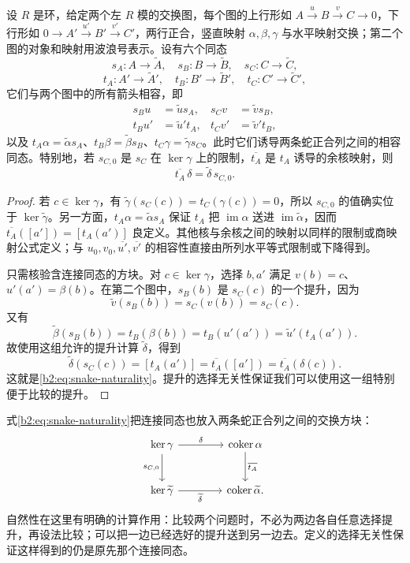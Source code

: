\begin{proposition}[蛇引理的自然性]\label{b2:prop:snake-naturality}
	设 \(R\) 是环，给定两个左 \(R\) 模的交换图，每个图的上行形如 \(A\xrightarrow{u}B\xrightarrow{v}C\to0\)，下行形如 \(0\to A'\xrightarrow{u'}B'\xrightarrow{v'}C'\)，两行正合，竖直映射 \(\alpha,\beta,\gamma\) 与水平映射交换；第二个图的对象和映射用波浪号表示。设有六个同态
	\[
		s_A:A\to\widetilde A,\quad s_B:B\to\widetilde B,\quad s_C:C\to\widetilde C,
	\]
	\[
		t_A:A'\to\widetilde A',\quad t_B:B'\to\widetilde B',\quad t_C:C'\to\widetilde C',
	\]
	它们与两个图中的所有箭头相容，即
	\[
		\begin{aligned}
			s_Bu&=\widetilde u s_A,&s_Cv&=\widetilde v s_B,\\
			t_Bu'&=\widetilde u' t_A,&t_Cv'&=\widetilde v' t_B,
		\end{aligned}
	\]
	以及 \(t_A\alpha=\widetilde\alpha s_A\)、\(t_B\beta=\widetilde\beta s_B\)、\(t_C\gamma=\widetilde\gamma s_C\)。此时它们诱导两条蛇正合列之间的相容同态。特别地，若 \(s_{C,0}\) 是 \(s_C\) 在 \(\ker\gamma\) 上的限制，\(\overline{t_A}\) 是 \(t_A\) 诱导的余核映射，则
	\begin{equation}\label{b2:eq:snake-naturality}
		\overline{t_A}\,\delta=\widetilde\delta\,s_{C,0}.
	\end{equation}
\end{proposition}

\begin{proof}
	若 \(c\in\ker\gamma\)，有 \(\widetilde\gamma(s_C(c))=t_C(\gamma(c))=0\)，所以 \(s_{C,0}\) 的值确实位于 \(\ker\widetilde\gamma\)。另一方面，\(t_A\alpha=\widetilde\alpha s_A\) 保证 \(t_A\) 把 \(\operatorname{im}\alpha\) 送进 \(\operatorname{im}\widetilde\alpha\)，因而 \(\overline{t_A}([a'])=[t_A(a')]\) 良定义。其他核与余核之间的映射以同样的限制或商映射公式定义；与 \(u_0,v_0,\overline{u'},\overline{v'}\) 的相容性直接由所列水平等式限制或下降得到。

	只需核验含连接同态的方块。对 \(c\in\ker\gamma\)，选择 \(b,a'\) 满足 \(v(b)=c\)、\(u'(a')=\beta(b)\)。在第二个图中，\(s_B(b)\) 是 \(s_C(c)\) 的一个提升，因为
	\[
		\widetilde v(s_B(b))=s_C(v(b))=s_C(c).
	\]
	又有
	\[
		\widetilde\beta(s_B(b)) =t_B(\beta(b)) =t_B(u'(a')) =\widetilde u'(t_A(a')).
	\]
	故使用这组允许的提升计算 \(\widetilde\delta\)，得到
	\[
		\widetilde\delta(s_C(c))=[t_A(a')] =\overline{t_A}([a'])=\overline{t_A}(\delta(c)).
	\]
	这就是\eqref{b2:eq:snake-naturality}。提升的选择无关性保证我们可以使用这一组特别便于比较的提升。
\end{proof}

式\eqref{b2:eq:snake-naturality}把连接同态也放入两条蛇正合列之间的交换方块：
\[
	\begin{tikzcd}[column sep=4em,row sep=2.5em]
		\ker\gamma\arrow[r,"\delta"]\arrow[d,"s_{C,0}"']&\operatorname{coker}\alpha\arrow[d,"\overline{t_A}"]\\
		\ker\widetilde\gamma\arrow[r,"\widetilde\delta"']&\operatorname{coker}\widetilde\alpha.
	\end{tikzcd}
\]
自然性在这里有明确的计算作用：比较两个问题时，不必为两边各自任意选择提升，再设法比较；可以把一边已经选好的提升送到另一边去。定义的选择无关性保证这样得到的仍是原先那个连接同态。

